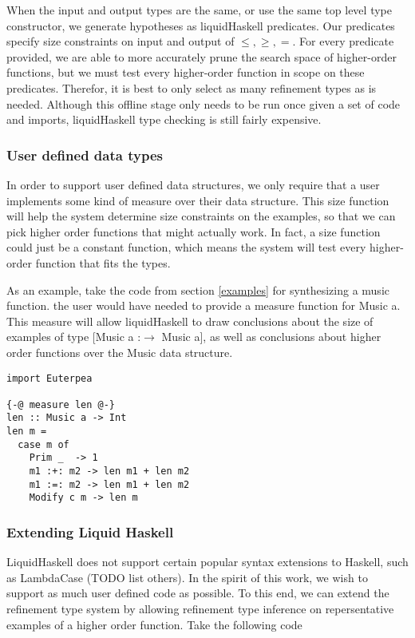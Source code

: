 When the input and output types are the same, or use the same top level type constructor, we generate hypotheses as liquidHaskell predicates.
Our predicates specify size constraints on input and output of $\leq,\geq,=$.
For every predicate provided, we are able to more accurately prune the search space of higher-order functions, but we must test every higher-order function in scope on these predicates. 
Therefor, it is best to only select as many refinement types as is needed.
Although this offline stage only needs to be run once given a set of code and imports, liquidHaskell type checking is still fairly expensive.



\subsubsection{User defined data types}
In order to support user defined data structures, we only require that a user implements some kind of measure\cite{realWorldLiquid} over their data structure.
This size function will help the system determine size constraints on the examples, so that we can pick higher order functions that might actually work.
In fact, a size function could just be a constant function, which means the system will test every higher-order function that fits the types. 

As an example, take the code from section \ref{examples} for synthesizing a music function.
the user would have needed to provide a measure function for Music a.
This measure will allow liquidHaskell to draw conclusions about the size of examples of type [Music a :$\to$ Music a], as well as conclusions about higher order functions over the Music data structure.

\begin{lstlisting}
import Euterpea

{-@ measure len @-}
len :: Music a -> Int
len m =
  case m of
    Prim _  -> 1
    m1 :+: m2 -> len m1 + len m2
    m1 :=: m2 -> len m1 + len m2
    Modify c m -> len m
\end{lstlisting}


\subsubsection{Extending Liquid Haskell}\label{extLiqHask}
LiquidHaskell does not support certain popular syntax extensions to Haskell, such as LambdaCase (TODO list others). In the spirit of this work, we wish to support as much user defined code as possible. To this end, we can extend the refinement type system by allowing refinement type inference on repersentative examples of a higher order function. Take the following code 

